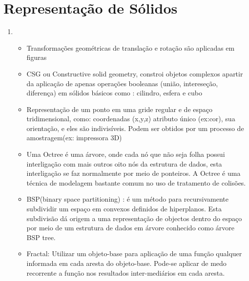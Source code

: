 \section*{Representação de Sólidos}

	\begin{enumerate}\addtocounter{enumi}{3}
		\item 

		\begin{itemize}
		\item 
		Transformações geométricas de translação e rotação são aplicadas
		em figuras
		\item 
		CSG ou Constructive solid geometry, constroi objetos complexos apartir da aplicação de apenas operações booleanas (união, intereseção, diferença) em sólidos básicos como : cilindro, esfera e cubo
		\item 
		Representação de um ponto em uma gride regular e de espaço tridimensional, como: 
		coordenadas (x,y,z) atributo único (ex:cor), sua orientação, e eles são indivisíveis. Podem
		ser obtidos por um processo de amostragem(ex: impressora 3D)		
		
		\item 
Uma Octree é uma árvore, onde cada nó que não seja folha possui interligação com mais outros oito nós da estrutura de dados, esta interligação se faz normalmente por meio de ponteiros. A Octree é uma técnica de modelagem bastante comum no uso de 	          tratamento de colisões. 
		\item 
		BSP(binary space partitioning) : é um método para recursivamente subdividir um espaço em convexos definidos de hiperplanos. Esta subdivisão dá origem a uma representação de objectos dentro do espaço por meio de um estrutura de dados em árvore conhecido como árvore BSP tree. 
		\item 
		Fractal: Utilizar um objeto-base para aplicação de uma função
		qualquer informada em cada aresta do objeto-base.
		Pode-se aplicar de medo recorrente a função nos 
		resultados inter-mediários em cada aresta.
		\end{itemize}		
	\end{enumerate}